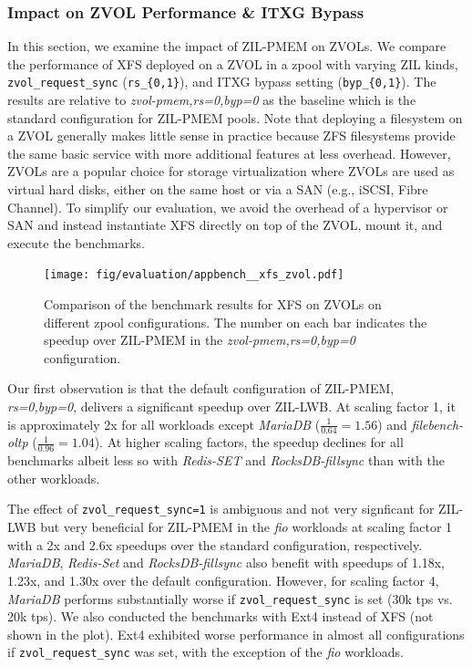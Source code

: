 \documentclass[12pt,a4paper,twoside]{book}
\begin{document}
\subsubsection{Impact on ZVOL Performance \& ITXG Bypass}\label{sec:eval:zvols_ad_itxg_bypass}

In this section, we examine the impact of ZIL-PMEM on ZVOLs.
We compare the performance of XFS deployed on a ZVOL in a zpool with varying ZIL kinds, \lstinline{zvol_request_sync} (\lstinline|rs_{0,1}|), and ITXG bypass setting (\lstinline|byp_{0,1}|).
The results are relative to \textit{zvol-pmem,rs=0,byp=0} as the baseline which is the standard configuration for ZIL-PMEM pools.
Note that deploying a filesystem on a ZVOL generally makes little sense in practice because ZFS filesystems provide the same basic service with more additional features at less overhead.
However, ZVOLs are a popular choice for storage virtualization where ZVOLs are used as virtual hard disks, either on the same host or via a SAN (e.g., iSCSI, Fibre Channel).
To simplify our evaluation, we avoid the overhead of a hypervisor or SAN and instead instantiate XFS directly on top of the ZVOL, mount it, and execute the benchmarks.

\begin{figure}[H]
    \centering
    \texttt{[image: fig/evaluation/appbench\_\_xfs\_zvol.pdf]}
    \caption{
        Comparison of the benchmark results for XFS on ZVOLs on different zpool configurations.
        The number on each bar indicates the speedup over ZIL-PMEM in the \textit{zvol-pmem,rs=0,byp=0} configuration.
    }
\end{figure}


Our first observation is that the default configuration of ZIL-PMEM, \textit{rs=0,byp=0}, delivers a significant speedup over ZIL-LWB.
At scaling factor 1, it is approximately 2x for all workloads except \textit{MariaDB} ($\frac{1}{0.64} = 1.56$) and \textit{filebench-oltp} ($\frac{1}{0.96} = 1.04$).
At higher scaling factors, the speedup declines for all benchmarks albeit less so with \textit{Redis-SET} and \textit{RocksDB-fillsync} than with the other workloads.

The effect of \lstinline{zvol_request_sync=1} is ambiguous and not very signficant for ZIL-LWB but very beneficial for ZIL-PMEM in the \textit{fio} workloads at scaling factor 1 with a 2x and 2.6x speedups over the standard configuration, respectively.
\textit{MariaDB}, \textit{Redis-Set} and \textit{RocksDB-fillsync} also benefit with speedups of 1.18x, 1.23x, and 1.30x over the default configuration.
However, for scaling factor 4, \textit{MariaDB} performs substantially worse if \lstinline{zvol_request_sync} is set (30k tps vs. 20k tps).
We also conducted the benchmarks with Ext4 instead of XFS (not shown in the plot).
Ext4 exhibited worse performance in almost all configurations if \lstinline{zvol_request_sync} was set, with the exception of the \textit{fio} workloads.
\end{document}
